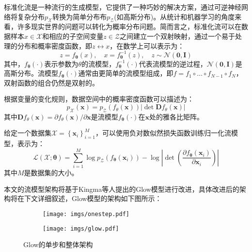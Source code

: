 标准化流是一种流行的生成模型\cite{nice,realnvp,naf,glow,sos}，它提供了一种巧妙的解决方案，通过可逆神经网络将复杂分布$p_{\mathcal{X}}$转换为简单分布布$p_{\mathcal{Z}}$(如高斯分布)。从统计和机器学习的角度来看，许多现实世界的问题可以转化为概率分布问题。简而言之，标准化流可以在数据样本$x \in \mathcal{X}$和相应的子空间变量$z \in \mathcal{Z}$之间建立一个双射映射，通过一个易于处理的分布和概率密度函数，即$z \leftrightarrow x$，在数学上可以表示为：
\begin{equation}
	z=f_{\boldsymbol{\theta}}(x), \quad x=f_{\boldsymbol{\theta}}^{-1}(z), \quad z \sim \mathcal{N}(\mathbf{0}, \mathbf{I})
\end{equation}
其中，$f_{\boldsymbol{\theta}}(\cdot)$表示参数为$\theta$的流模型，$f_{\boldsymbol{\theta}}^{-1}(\cdot)$代表流模型的逆过程，$\mathcal{N}(\mathbf{0}, \mathbf{I})$是高斯分布。流模型$f_{\boldsymbol{\theta}}(\cdot)$通常由更简单的流模型组成，即$f=f_1 \circ \ldots \circ f_{N-1} \circ f_N$，双射函数的组合仍然是双射的。

根据变量的变化规则\cite{nice}，数据空间中的概率密度函数可以描述为：
\begin{equation}
	p_{\mathcal{X}}(\boldsymbol{x})=p_{\mathcal{Z}}\left(f_\theta(\boldsymbol{x})\right)\left|\operatorname{det} \mathbf{D} f_\theta(\boldsymbol{x})\right|
\end{equation}
其中$\mathbf{D} f_\theta(\boldsymbol{x})=\partial f_\theta(\boldsymbol{x}) / \partial \boldsymbol{x}$是流模型$f_{\boldsymbol{\theta}}(\cdot)$在$\boldsymbol{x}$处的雅各比矩阵。

给定一个数据集$\mathcal{X}=\left\{\boldsymbol{x}_i\right\}_{i=1}^M$，可以使用负对数似然损失函数\cite{nice}训练归一化流模型，表示为：
\begin{equation}
	\mathcal{L}(\mathcal{X} ; \boldsymbol{\theta})=\sum_{i=1}^M \log p_{\mathcal{Z}}\left(f_{\boldsymbol{\theta}}\left(\boldsymbol{x}_i\right)\right)-\log \left|\operatorname{det}\left(\frac{\partial f_{\boldsymbol{\theta}}\left(\boldsymbol{x}_i\right)}{\partial \boldsymbol{x}_i}\right)\right|
	\label{nllloss}
\end{equation}
其中$M$是数据集的大小。

本文的流模型架构将基于Kingma等人提出的Glow模型\cite{glow}进行改进，具体改进后的架构将在下文详细叙述，Glow模型的架构如下图所示：

\begin{figure}[htbp]
	\centering
	\begin{subfigure}{0.49\linewidth}
		\centering
		\texttt{[image: imgs/onestep.pdf]}

		\label{onestep}%
	\end{subfigure}
	\centering
	\begin{subfigure}{0.49\linewidth}
		\centering
		\texttt{[image: imgs/glow.pdf]}
	
		\label{glow}%
	\end{subfigure}  
	
	\caption{Glow的单步和整体架构\cite{glow}}
\end{figure}

